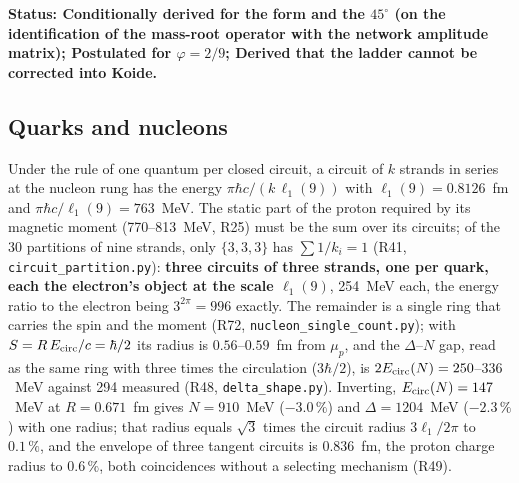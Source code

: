 \documentclass[11pt,a4paper]{article}
\theoremstyle{plain}
\theoremstyle{remark}
\newcommand{\lone}{\ensuremath{\ell_1}}
\newcommand{\status}[1]{\medskip\noindent\textbf{Status: #1.}\ }
\begin{document}
\status{Conditionally derived for the form and the $45^\circ$ (on the identification of the
mass-root operator with the network amplitude matrix); Postulated for $\varphi = 2/9$;
Derived that the ladder cannot be corrected into Koide}

\subsection{Quarks and nucleons}\label{sec:nucleon}

Under the rule of one quantum per closed circuit, a circuit of $k$ strands in series at the
nucleon rung has the energy $\pi\hbar c/(k\,\lone(9))$ with $\lone(9) = 0.8126$~fm and
$\pi\hbar c/\lone(9) = 763$~MeV. The static part of the proton required by its magnetic moment
(770--813~MeV, R25) must be the sum over its circuits; of the 30 partitions of nine strands, only
$\{3,3,3\}$ has $\sum 1/k_i = 1$ (R41, \texttt{circuit\_partition.py}): \textbf{three circuits of
three strands, one per quark, each the electron's object at the scale $\lone(9)$}, 254~MeV each,
the energy ratio to the electron being $3^{2\pi} = 996$ exactly. The remainder is a single ring
that carries the spin and the moment (R72, \texttt{nucleon\_single\_count.py}); with
$S = R\,E_{\rm circ}/c = \hbar/2$ its radius is $0.56$--$0.59$~fm from $\mu_p$, and the
$\Delta$--$N$ gap, read as the same ring with three times the circulation ($3\hbar/2$), is
$2E_{\rm circ}(N) = 250$--$336$~MeV against 294 measured (R48, \texttt{delta\_shape.py}).
Inverting, $E_{\rm circ}(N) = 147$~MeV at $R = 0.671$~fm gives $N = 910$~MeV ($-3.0\,\%$) and
$\Delta = 1204$~MeV ($-2.3\,\%$) with one radius; that radius equals $\sqrt3$ times the circuit
radius $3\lone/2\pi$ to $0.1\,\%$, and the envelope of three tangent circuits is $0.836$~fm, the
proton charge radius to $0.6\,\%$, both coincidences without a selecting mechanism (R49).
\end{document}
